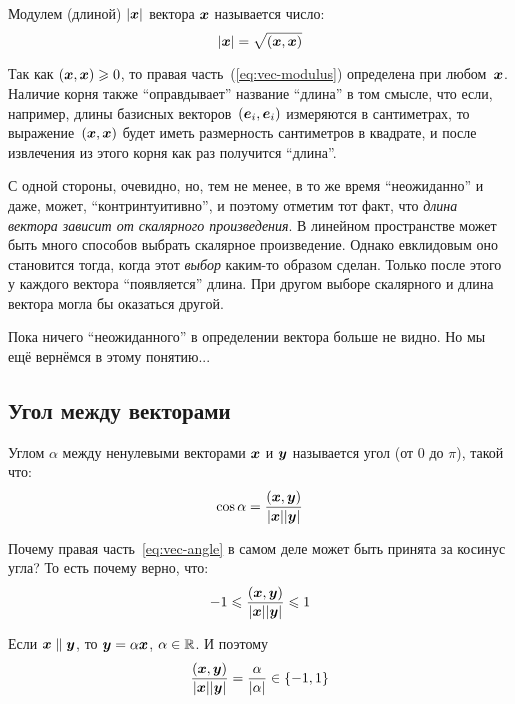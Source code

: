 \documentclass[a4paper,12pt]{article}
\begin{document}
  \begin{definition}
    Модулем (длиной) $|\boldsymbol x|$ вектора $\boldsymbol x$ называется число:
    \begin{equation}\label{eq:vec-modulus}
      |\boldsymbol x| = \sqrt{(\boldsymbol x, \boldsymbol x)}
    \end{equation}
  \end{definition}
  
  Так как $(\bds x, \bds x) \hm\geq 0$, то правая часть~(\ref{eq:vec-modulus}) определена при любом~$\boldsymbol x$.
  Наличие корня также ``оправдывает'' название ``длина'' в том смысле, что если, например, длины базисных векторов~$(\boldsymbol e_i, \boldsymbol e_i)$ измеряются в сантиметрах, то выражение~$(\boldsymbol x, \boldsymbol x)$ будет иметь размерность сантиметров в квадрате, и после извлечения из этого корня как раз получится ``длина''.
  
  С одной стороны, очевидно, но, тем не менее, в то же время ``неожиданно'' и даже, может, ``контринтуитивно'', и поэтому отметим тот факт, что \emph{длина вектора зависит от скалярного произведения}.
  В линейном пространстве может быть много способов выбрать скалярное произведение.
  Однако евклидовым оно становится тогда, когда этот \emph{выбор} каким-то образом сделан.
  Только после этого у каждого вектора ``появляется'' длина.
  При другом выборе скалярного и длина вектора могла бы оказаться другой.
  
  Пока ничего ``неожиданного'' в определении вектора больше не видно.
  Но мы ещё вернёмся в этому понятию...
  
  
  \subsection{Угол между векторами}
  
  \begin{definition}
    Углом $\alpha$ между ненулевыми векторами $\boldsymbol x$ и $\boldsymbol y$ называется угол (от $0$ до $\pi$), такой что:
    \begin{equation}\label{eq:vec-angle}
      \cos\alpha = \frac{(\boldsymbol x, \boldsymbol y)}{|\boldsymbol x| |\boldsymbol y|}
    \end{equation}
  \end{definition}
  
  Почему правая часть~\ref{eq:vec-angle} в самом деле может быть принята за косинус угла?
  То есть почему верно, что:
  \[
    -1 \leqslant \frac{(\boldsymbol x, \boldsymbol y)}{|\boldsymbol x| |\boldsymbol y|} \leqslant 1
  \]
  
  Если $\bds x \hm\parallel \bds y$, то $\bds y \hm= \alpha \bds x$, $\alpha \hm\in \RR$.
  И поэтому
  \[
    \frac{(\boldsymbol x, \boldsymbol y)}{|\boldsymbol x| |\boldsymbol y|} = \frac{\alpha}{|\alpha|} \in \{-1, 1\}
  \]
  
\end{document}
